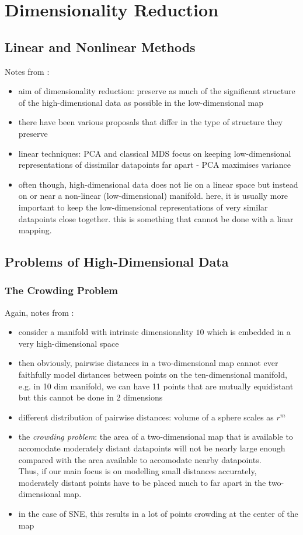 \chapter{Dimensionality Reduction}\label{chapter:dimensionality-reduction}

\section{Linear and Nonlinear Methods}
Notes from \cite{vdMaa08}: 
\begin{itemize}
    \item aim of dimensionality reduction: preserve as much of the significant structure of the high-dimensional data as possible in the low-dimensional map 
    \item there have been various proposals that differ in the type of structure they preserve 
    \item linear techniques: PCA and classical MDS focus on keeping low-dimensional representations of dissimilar datapoints far apart - PCA maximises variance 
    \item often though, high-dimensional data does not lie on a linear space but instead on or near a non-linear (low-dimensional) manifold. here, it is usually more important to keep the low-dimensional representations of very similar datapoints close together. this is something that cannot be done with a linar mapping. 
\end{itemize}

\section{Problems of High-Dimensional Data}
\subsection{The Crowding Problem}
Again, notes from \cite{vdMaa08}: 
\begin{itemize}
    \item consider a manifold with intrinsic dimensionality $10$ which is embedded in a very high-dimensional space 
    \item then obviously, pairwise distances in a two-dimensional map cannot ever faithfully model distances between points on the ten-dimensional manifold, e.g. in 10 dim manifold, we can have 11 points that are mutually equidistant but this cannot be done in 2 dimensions 
    \item different distribution of pairwise distances: volume of a sphere scales as $r^m$ 
    \item the \textit{crowding problem}: the area of a two-dimensional map that is available to accomodate moderately distant datapoints will not be nearly large enough compared with the area available to accomodate nearby datapoints. \\
    Thus, if our main focus is on modelling small distances accurately, moderately distant points have to be placed much to far apart in the two-dimensional map. 
    \item in the case of SNE, this results in a lot of points crowding at the center of the map 
\end{itemize}
